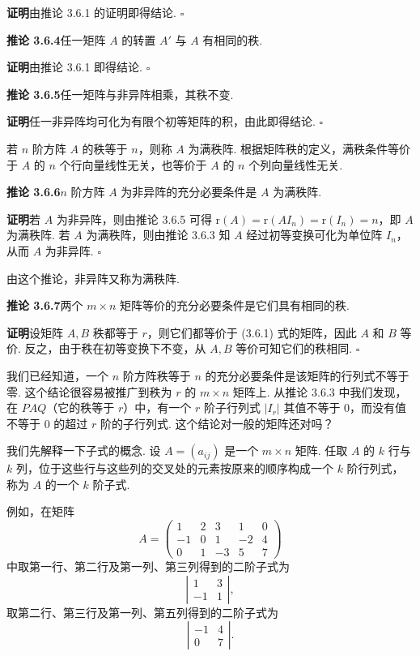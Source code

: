 \documentclass[UTF8,12pt,a4paper,fontset=fandol]{ctexart}
\begin{document}
\noindent\textbf{证明}\quad 由推论 3.6.1 的证明即得结论. $\square$

\noindent\textbf{推论 3.6.4}\quad 任一矩阵 $A$ 的转置 $A'$ 与 $A$ 有相同的秩.

\noindent\textbf{证明}\quad 由推论 3.6.1 即得结论. $\square$

\noindent\textbf{推论 3.6.5}\quad 任一矩阵与非异阵相乘，其秩不变.

\noindent\textbf{证明}\quad 任一非异阵均可化为有限个初等矩阵的积，由此即得结论. $\square$

若 $n$ 阶方阵 $A$ 的秩等于 $n$，则称 $A$ 为满秩阵. 根据矩阵秩的定义，满秩条件等价于 $A$ 的 $n$ 个行向量线性无关，也等价于 $A$ 的 $n$ 个列向量线性无关.

\noindent\textbf{推论 3.6.6}\quad $n$ 阶方阵 $A$ 为非异阵的充分必要条件是 $A$ 为满秩阵.

\noindent\textbf{证明}\quad 若 $A$ 为非异阵，则由推论 3.6.5 可得 $\mathrm{r}(A)=\mathrm{r}(AI_n)=\mathrm{r}(I_n)=n$，即 $A$ 为满秩阵. 若 $A$ 为满秩阵，则由推论 3.6.3 知 $A$ 经过初等变换可化为单位阵 $I_n$，从而 $A$ 为非异阵. $\square$

由这个推论，非异阵又称为满秩阵.

\noindent\textbf{推论 3.6.7}\quad 两个 $m\times n$ 矩阵等价的充分必要条件是它们具有相同的秩.

\noindent\textbf{证明}\quad 设矩阵 $A,B$ 秩都等于 $r$，则它们都等价于 (3.6.1) 式的矩阵，因此 $A$ 和 $B$ 等价. 反之，由于秩在初等变换下不变，从 $A,B$ 等价可知它们的秩相同. $\square$

我们已经知道，一个 $n$ 阶方阵秩等于 $n$ 的充分必要条件是该矩阵的行列式不等于零. 这个结论很容易被推广到秩为 $r$ 的 $m\times n$ 矩阵上. 从推论 3.6.3 中我们发现，在 $PAQ$（它的秩等于 $r$）中，有一个 $r$ 阶子行列式 $|I_r|$ 其值不等于 0，而没有值不等于 0 的超过 $r$ 阶的子行列式. 这个结论对一般的矩阵还对吗？

我们先解释一下子式的概念. 设 $A=(a_{ij})$ 是一个 $m\times n$ 矩阵. 任取 $A$ 的 $k$ 行与 $k$ 列，位于这些行与这些列的交叉处的元素按原来的顺序构成一个 $k$ 阶行列式，称为 $A$ 的一个 $k$ 阶子式.

例如，在矩阵
\[
A=\left(\begin{array}{rrrrr}
1&2&3&1&0\\
-1&0&1&-2&4\\
0&1&-3&5&7
\end{array}\right)
\]
中取第一行、第二行及第一列、第三列得到的二阶子式为
\[
\left|\begin{array}{rr}
1&3\\
-1&1
\end{array}\right|,
\]
取第二行、第三行及第一列、第五列得到的二阶子式为
\[
\left|\begin{array}{rr}
-1&4\\
0&7
\end{array}\right|.
\]
\end{document}
